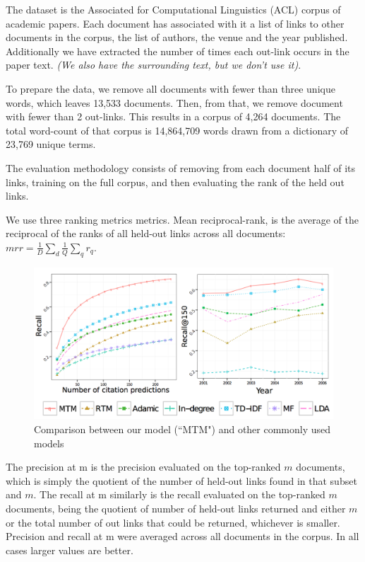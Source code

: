 The dataset is the Associated for Computational Linguistics (ACL) corpus of academic papers. Each document has associated with it a list of links to other documents in the corpus, the list of authors, the venue and the year published. Additionally we have extracted the number of times each out-link occurs in the paper text. \emph{(We also have the surrounding text, but we don't use it)}.

To prepare the data, we remove all documents with fewer than three unique words, which leaves 13,533 documents. Then, from that, we remove document with fewer than 2 out-links. This results in a corpus of 4,264 documents. The total word-count of that corpus is 14,864,709 words drawn from a dictionary of 23,769 unique terms.

The evaluation methodology consists of removing from each document half of its links, training on the full corpus, and then evaluating the rank of the held out links.

We use three ranking metrics metrics. Mean reciprocal-rank, is the average of the reciprocal of the ranks of all held-out links across all documents: $mrr = \frac{1}{D} \sum_d \frac{1}{Q} \sum_q r_q$.  


\begin{figure}
  \centering
    \hspace*{-1.5cm}\includegraphics[height=0.33\textheight]{./Chap6/plots/figs/fig-1.png}
  \caption{Comparison between our model (``MTM") and other commonly used models}
  \label{fig:chap5-fig-compare-2}
\end{figure}

The precision at m is the precision evaluated on the top-ranked $m$ documents, which is simply the quotient of the number of held-out links found in that subset and $m$. The recall at m similarly is the recall evaluated on the top-ranked $m$ documents, being the quotient of number of held-out links returned and either $m$ or the total number of out links that could be returned, whichever is smaller. Precision and recall at m were averaged across all documents in the corpus. In all cases larger values are better.

